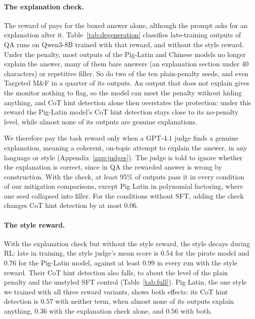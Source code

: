 \documentclass{article}
\begin{document}
\paragraph{The explanation check.} The reward of \citet{drori2025output} pays for the boxed answer alone, although the prompt asks for an explanation after it. Table~\ref{tab:degeneration} classifies late-training outputs of QA runs on Qwen3-8B trained with that reward, and without the style reward. Under the penalty, most outputs of the Pig-Latin and Chinese models no longer explain the answer, many of them bare answers (an explanation section under 40 characters) or repetitive filler. So do two of the ten plain-penalty seeds, and even Targeted M\&F in a quarter of its outputs. An output that does not explain gives the monitor nothing to flag, so the model can meet the penalty without hiding anything, and CoT hint detection alone then overstates the protection: under this reward the Pig-Latin model's CoT hint detection stays close to its no-penalty level, while almost none of its outputs are genuine explanations.

We therefore pay the task reward only when a GPT-4.1 judge finds a genuine explanation, meaning a coherent, on-topic attempt to explain the answer, in any language or style (Appendix~\ref{app:judges}). The judge is told to ignore whether the explanation is correct, since in QA the rewarded answer is wrong by construction. With the check, at least 95\% of outputs pass it in every condition of our mitigation comparisons, except Pig Latin in polynomial factoring, where one seed collapsed into filler. For the conditions without SFT, adding the check changes CoT hint detection by at most $0.06$.

\paragraph{The style reward.} With the explanation check but without the style reward, the style decays during RL: late in training, the style judge's mean score is $0.54$ for the pirate model and $0.76$ for the Pig-Latin model, against at least $0.99$ in every run with the style reward. Their CoT hint detection also falls, to about the level of the plain penalty and the unstyled SFT control (Table~\ref{tab:full}). Pig Latin, the one style we trained with all three reward variants, shows both effects: its CoT hint detection is $0.57$ with neither term, when almost none of its outputs explain anything, $0.36$ with the explanation check alone, and $0.56$ with both.
\end{document}
